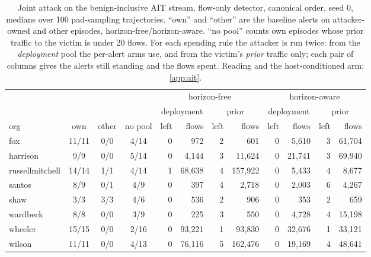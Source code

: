 \begin{table}[t]
\centering
\caption{Joint attack on the benign-inclusive AIT stream, flow-only detector, canonical order, seed 0,
medians over 100 pad-sampling trajectories. ``own'' and ``other'' are the baseline alerts on
attacker-owned and other episodes, horizon-free/horizon-aware. ``no pool'' counts own episodes whose
prior traffic to the victim is under 20 flows. For each spending rule the attacker is run twice: from the
\emph{deployment} pool the per-alert arms use, and from the victim's \emph{prior} traffic only; each pair
of columns gives the alerts still standing and the flows spent. Reading and the host-conditioned arm:
\cref{app:ait}.}
\label{apptab:joint76}
\footnotesize
\setlength{\tabcolsep}{4pt}
\begin{tabular}{lcccrrrrrrrr}
\toprule
& & & & \multicolumn{4}{c}{horizon-free} & \multicolumn{4}{c}{horizon-aware} \\
\cmidrule(lr){5-8}\cmidrule(lr){9-12}
& & & & \multicolumn{2}{c}{deployment} & \multicolumn{2}{c}{prior} & \multicolumn{2}{c}{deployment} & \multicolumn{2}{c}{prior} \\
\cmidrule(lr){5-6}\cmidrule(lr){7-8}\cmidrule(lr){9-10}\cmidrule(lr){11-12}
org & own & other & no pool & left & flows & left & flows & left & flows & left & flows \\
\midrule
fox & 11/11 & 0/0 & 4/14 & 0 & 972 & 2 & 601 & 0 & 5{,}610 & 3 & 61{,}704 \\
harrison & 9/9 & 0/0 & 5/14 & 0 & 4{,}144 & 3 & 11{,}624 & 0 & 21{,}741 & 3 & 69{,}940 \\
russellmitchell & 14/14 & 1/1 & 4/14 & 1 & 68{,}638 & 4 & 157{,}922 & 0 & 5{,}433 & 4 & 8{,}677 \\
santos & 8/9 & 0/1 & 4/9 & 0 & 397 & 4 & 2{,}718 & 0 & 2{,}003 & 6 & 4{,}267 \\
shaw & 3/3 & 3/3 & 4/6 & 0 & 536 & 2 & 906 & 0 & 353 & 2 & 659 \\
wardbeck & 8/8 & 0/0 & 3/9 & 0 & 225 & 3 & 550 & 0 & 4{,}728 & 4 & 15{,}198 \\
wheeler & 15/15 & 0/0 & 2/16 & 0 & 93{,}221 & 1 & 93{,}830 & 0 & 32{,}676 & 1 & 33{,}121 \\
wilson & 11/11 & 0/0 & 4/13 & 0 & 76{,}116 & 5 & 162{,}476 & 0 & 19{,}169 & 4 & 48{,}641 \\
\bottomrule
\end{tabular}
\end{table}
